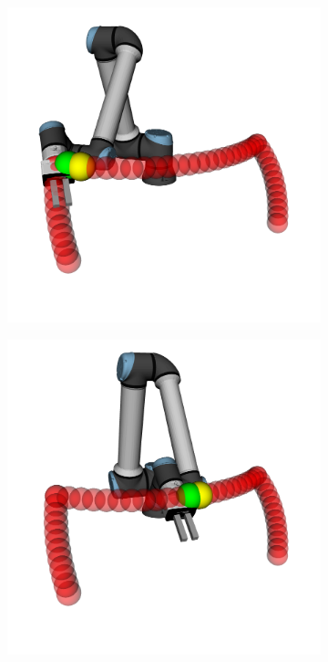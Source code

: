 \begin{figure}[h]
\begin{subfigure}{.2\linewidth}
    \end{subfigure}%
    \begin{subfigure}{.2\linewidth}
        \centering
        \includegraphics[width=\linewidth]{figs/chp4/trajectory_2.png}
    \end{subfigure}%
    \begin{subfigure}{.2\linewidth}
        \centering
        \includegraphics[width=\linewidth]{figs/chp4/trajectory_3.png}

\end{subfigure}
\end{figure}
